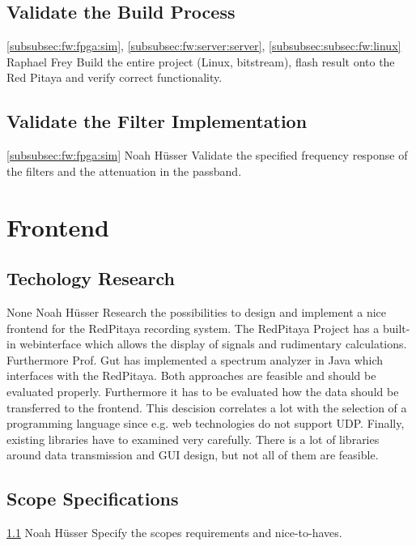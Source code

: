 \documentclass[a4paper,oneside]{alpenspecs/alpenspecs}
\begin{document}
\subsection{Validate the Build Process}
\label{subsec:validation:build}
\wpac
    {}
    {}
    {}
    {\ref{subsubsec:fw:fpga:sim}, \ref{subsubsec:fw:server:server}, \ref{subsubsec:subsec:fw:linux}}
    {}
    {Raphael Frey}
    {%
        Build the entire project (Linux, bitstream), flash
        result onto the Red Pitaya and verify correct functionality.
    }

\subsection{Validate the Filter Implementation}
\label{subsec:validation:impl}
\wpac
    {}
    {}
    {}
    {\ref{subsubsec:fw:fpga:sim}}
    {}
    {Noah Hüsser}
    {%
        Validate the specified frequency response of the filters and the attenuation in the passband.
    }

\section{Frontend}
\label{sec:frontend}

\subsection{Techology Research}
\label{subsec:frontend:research}
\wpac
    {}
    {}
    {}
    {None}
    {}
    {Noah Hüsser}
    {%
        Research the possibilities to design and implement a nice frontend for the RedPitaya recording system.
        The RedPitaya Project has a built-in webinterface which allows the display of signals and rudimentary calculations.
        Furthermore Prof. Gut has implemented a spectrum analyzer in Java which interfaces with the RedPitaya.
        Both approaches are feasible and should be evaluated properly.
        Furthermore it has to be evaluated how the data should be transferred to the frontend.
        This descision correlates a lot with the selection of a programming language since e.g. web technologies do not support UDP.
        Finally, existing libraries have to examined very carefully. There is a lot of libraries around data transmission and GUI design, but not all of them are feasible.
    }

\subsection{Scope Specifications}
\label{subsec:frontend:specify}
\wpac
    {}
    {}
    {}
    {\ref{subsec:frontend:research}}
    {}
    {Noah Hüsser}
    {%
        Specify the scopes requirements and nice-to-haves.
    }
\end{document}
